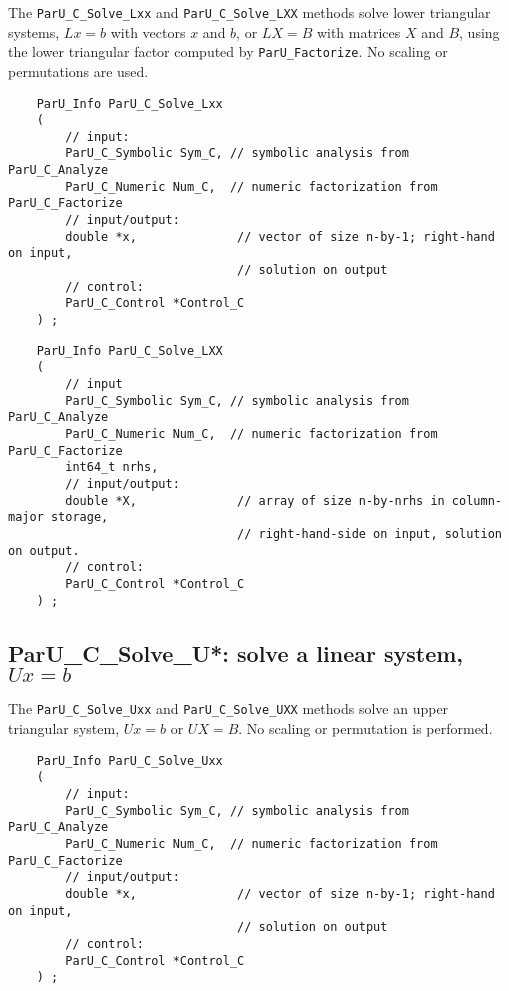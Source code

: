 \documentclass[12pt]{article}
\begin{document}
    The \verb'ParU_C_Solve_Lxx' and \verb'ParU_C_Solve_LXX' methods solve lower
    triangular systems, $Lx=b$ with vectors $x$ and $b$, or $LX=B$ with
    matrices $X$ and $B$, using the lower triangular factor computed by
    \verb'ParU_Factorize'.  No scaling or permutations are used.

    {\footnotesize
    \begin{verbatim}
    ParU_Info ParU_C_Solve_Lxx
    (
        // input:
        ParU_C_Symbolic Sym_C, // symbolic analysis from ParU_C_Analyze
        ParU_C_Numeric Num_C,  // numeric factorization from ParU_C_Factorize
        // input/output:
        double *x,              // vector of size n-by-1; right-hand on input,
                                // solution on output
        // control:
        ParU_C_Control *Control_C
    ) ; \end{verbatim} }

    {\footnotesize
    \begin{verbatim}
    ParU_Info ParU_C_Solve_LXX
    (
        // input
        ParU_C_Symbolic Sym_C, // symbolic analysis from ParU_C_Analyze
        ParU_C_Numeric Num_C,  // numeric factorization from ParU_C_Factorize
        int64_t nrhs,
        // input/output:
        double *X,              // array of size n-by-nrhs in column-major storage,
                                // right-hand-side on input, solution on output.
        // control:
        ParU_C_Control *Control_C
    ) ; \end{verbatim} }

\subsection{{\sf ParU\_C\_Solve\_U*}: solve a linear system, $Ux=b$}

    The \verb'ParU_C_Solve_Uxx' and \verb'ParU_C_Solve_UXX' methods solve an
    upper triangular system, $Ux=b$ or $UX=B$.  No scaling or permutation is
    performed.

    {\footnotesize
    \begin{verbatim}
    ParU_Info ParU_C_Solve_Uxx
    (
        // input:
        ParU_C_Symbolic Sym_C, // symbolic analysis from ParU_C_Analyze
        ParU_C_Numeric Num_C,  // numeric factorization from ParU_C_Factorize
        // input/output:
        double *x,              // vector of size n-by-1; right-hand on input,
                                // solution on output
        // control:
        ParU_C_Control *Control_C
    ) ; \end{verbatim} }
\end{document}
